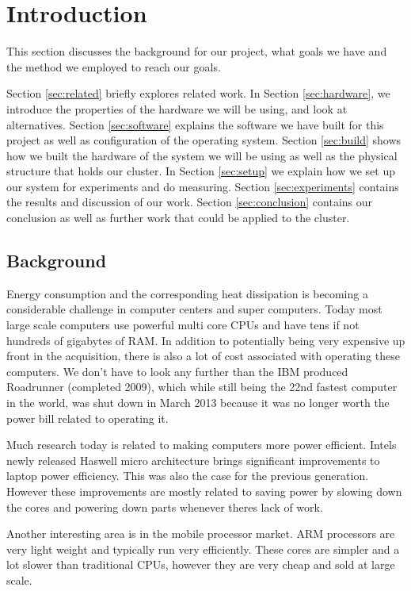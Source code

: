 \clearpage
\section{Introduction}
\label{sec:introduction}

This section discusses the background for our project, what goals we have and the method we employed to reach our goals.

Section \ref{sec:related} briefly explores related work.
In Section \ref{sec:hardware}, we introduce the properties of the hardware we will be using, and look at alternatives.
Section \ref{sec:software} explains the software we have built for this project as well as configuration of the operating system.
Section \ref{sec:build} shows how we built the hardware of the system we will be using as well as the physical structure that holds our cluster.
In Section \ref{sec:setup} we explain how we set up our system for experiments and do measuring.
Section \ref{sec:experiments} contains the results and discussion of our work.
Section \ref{sec:conclusion} contains our conclusion as well as further work that could be applied to the cluster.

\subsection{Background}
Energy consumption and the corresponding heat dissipation is becoming a considerable challenge in computer centers and super computers. Today most large scale computers use powerful multi core CPUs and have tens if not hundreds of gigabytes of RAM. In addition to potentially being very expensive up front in the acquisition, there is also a lot of cost associated with operating these computers. We don't have to look any further than the IBM produced Roadrunner (completed 2009), which while still being the 22nd fastest computer in the world, was shut down in March 2013 because it was no longer worth the power bill related to operating it.\cite{roadrunner}

Much research today is related to making computers more power efficient. Intels newly released Haswell micro architecture brings significant improvements to laptop power efficiency. This was also the case for the previous generation. However these improvements are mostly related to saving power by slowing down the cores and powering down parts whenever theres lack of work.

Another interesting area is in the mobile processor market. ARM processors are very light weight and typically run very efficiently. These cores are simpler and a lot slower than traditional CPUs, however they are very cheap and sold at large scale.

